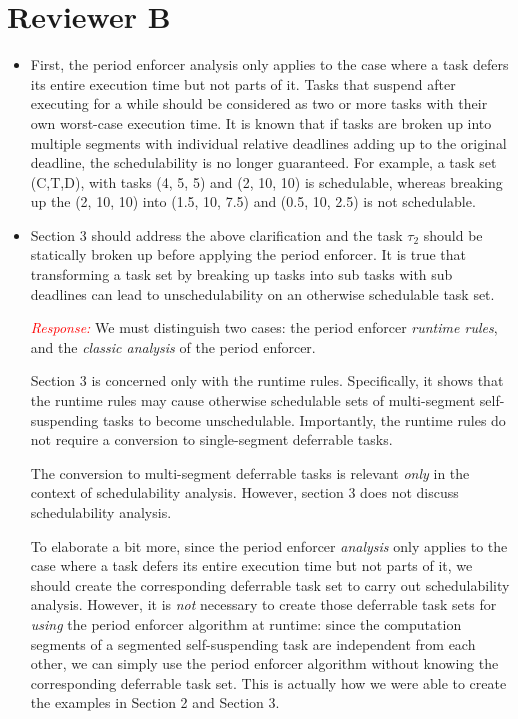 \documentclass[12pt]{article}
\newenvironment{response}[0]{\textcolor{red}{\emph{Response: }}\color{blue}}{\medskip}
\begin{document}
\section*{Reviewer B}
\begin{itemize}
	\item  First, the period enforcer analysis only applies to the case where a task
defers its entire execution time but not parts of it. Tasks that suspend
after executing for a while should be considered as two or more tasks with
their own worst-case execution time. It is known that if tasks are broken up
into multiple segments with individual relative deadlines adding up to the
original deadline, the schedulability is no longer guaranteed. For example,
a task set (C,T,D), with tasks (4, 5, 5) and (2, 10, 10) is schedulable,
whereas breaking up the (2, 10, 10) into (1.5, 10, 7.5) and (0.5, 10, 2.5)
is not schedulable.
	\item Section 3 should address the above clarification and the task $\tau_2$ should
be statically broken up before applying the period enforcer. It is true that
transforming a task set by breaking up tasks into sub tasks with sub
deadlines can lead to unschedulability on an otherwise schedulable task set.


\begin{response}
We must distinguish two cases: the period enforcer \emph{runtime rules}, and the \emph{classic analysis} of the period enforcer.

Section 3 is concerned only with the runtime rules. Specifically, it shows that the runtime rules may cause otherwise schedulable sets of multi-segment self-suspending tasks to become unschedulable. Importantly, the runtime rules do not require a conversion to single-segment deferrable tasks.

The conversion to multi-segment deferrable tasks is relevant \emph{only} in the context of schedulability analysis. However, section 3 does not discuss schedulability analysis.

To elaborate a bit more, since the period enforcer \emph{analysis} only applies to the case where a task defers its entire execution time but not parts of it, we should create the corresponding deferrable task set to carry out schedulability analysis. However, it is \emph{not} necessary to create those deferrable task sets for \emph{using} the period enforcer algorithm at runtime: since the computation segments of a segmented self-suspending task are independent from each other, we can simply use the period enforcer algorithm without knowing the corresponding deferrable task set. This is actually how we were able to create the examples in Section 2 and Section 3.


\end{response}
\end{itemize}
\end{document}
